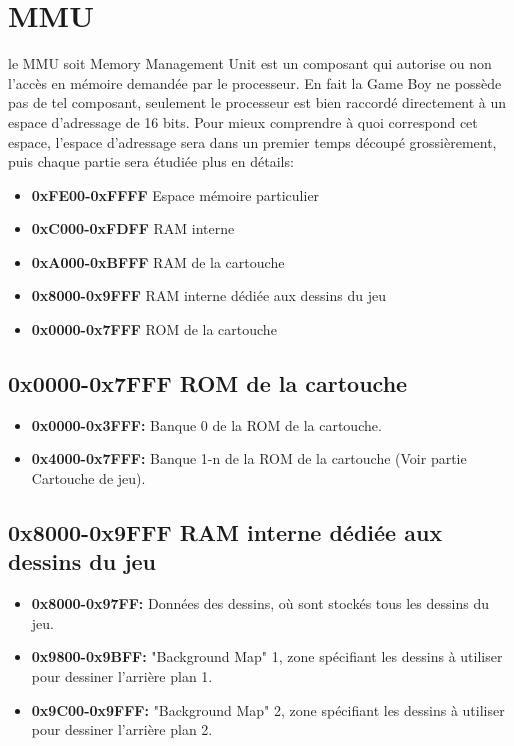 \documentclass{report}
\begin{document}
\section{MMU}
le MMU soit Memory Management Unit est un composant qui autorise ou non l'accès en mémoire demandée par le processeur.
En fait la Game Boy ne possède pas de tel composant, seulement le processeur est bien raccordé directement à un espace d'adressage de 16 bits.
Pour mieux comprendre à quoi correspond cet espace, l'espace d'adressage sera
dans un premier temps découpé grossièrement, puis chaque partie sera étudiée
plus en détails:\\
\begin{itemize}
\item \textbf{0xFE00-0xFFFF} Espace mémoire particulier
\item \textbf{0xC000-0xFDFF} RAM interne
\item \textbf{0xA000-0xBFFF} RAM de la cartouche
\item \textbf{0x8000-0x9FFF} RAM interne dédiée aux dessins du jeu
\item \textbf{0x0000-0x7FFF} ROM de la cartouche
\end{itemize}

\subsection{0x0000-0x7FFF ROM de la cartouche}
\begin{itemize}
\item \textbf{0x0000-0x3FFF:} Banque 0 de la ROM de la cartouche.
\item \textbf{0x4000-0x7FFF:} Banque 1-n de la ROM de la cartouche (Voir partie Cartouche de jeu).
\end{itemize}

\subsection{0x8000-0x9FFF RAM interne dédiée aux dessins du jeu}
\begin{itemize}
\item \textbf{0x8000-0x97FF:} Données des dessins, où sont stockés tous les dessins du jeu.
\item \textbf{0x9800-0x9BFF:} "Background Map" 1, zone spécifiant les dessins à utiliser pour dessiner l'arrière plan 1.
\item \textbf{0x9C00-0x9FFF:} "Background Map" 2, zone spécifiant les dessins à utiliser pour dessiner l'arrière plan 2. 
\end{itemize} 
\end{document}

